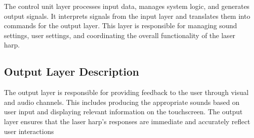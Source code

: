 The control unit layer processes input data, manages system logic, and generates output signals. It interprets signals from the input layer and translates them into commands for the output layer. This layer is responsible for managing sound settings, user settings, and coordinating the overall functionality of the laser harp.

\subsection{Output Layer Description}

The output layer is responsible for providing feedback to the user through visual and audio channels. This includes producing the appropriate sounds based on user input and displaying relevant information on the touchscreen. The output layer ensures that the laser harp's responses are immediate and accurately reflect user interactions
